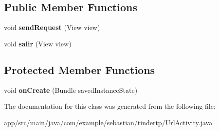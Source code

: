 \subsection*{Public Member Functions}
\begin{DoxyCompactItemize}
\item 
void {\bfseries send\+Request} (View view)\hypertarget{classcom_1_1example_1_1sebastian_1_1tindertp_1_1UrlActivity_ad9a6b6bdf98a40999f81ac4cfe491bae}{}\label{classcom_1_1example_1_1sebastian_1_1tindertp_1_1UrlActivity_ad9a6b6bdf98a40999f81ac4cfe491bae}

\item 
void {\bfseries salir} (View view)\hypertarget{classcom_1_1example_1_1sebastian_1_1tindertp_1_1UrlActivity_a0d0a80e70c2eda5021d5d7b557437720}{}\label{classcom_1_1example_1_1sebastian_1_1tindertp_1_1UrlActivity_a0d0a80e70c2eda5021d5d7b557437720}

\end{DoxyCompactItemize}
\subsection*{Protected Member Functions}
\begin{DoxyCompactItemize}
\item 
void {\bfseries on\+Create} (Bundle saved\+Instance\+State)\hypertarget{classcom_1_1example_1_1sebastian_1_1tindertp_1_1UrlActivity_a4921f3f005e2fc881d402bbc195e2003}{}\label{classcom_1_1example_1_1sebastian_1_1tindertp_1_1UrlActivity_a4921f3f005e2fc881d402bbc195e2003}

\end{DoxyCompactItemize}


The documentation for this class was generated from the following file\+:\begin{DoxyCompactItemize}
\item 
app/src/main/java/com/example/sebastian/tindertp/Url\+Activity.\+java\end{DoxyCompactItemize}
